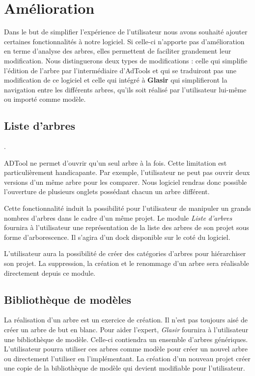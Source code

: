 \section{Amélioration}


	Dans le but de simplifier l'expérience de l'utilisateur nous avons souhaité ajouter certaines fonctionnalités à notre logiciel. Si celle-ci n'apporte pas d'amélioration en terme d'analyse des arbres, elles permettent de faciliter grandement leur modification. Nous distinguerons deux types de modifications : celle qui simplifie l'édition de l'arbre par l’intermédiaire d'AdTools et qui se traduiront pas une modification de ce logiciel et celle qui intégré à \textbf{Glasir} qui simplifieront la navigation entre les différents arbres, qu'ils soit réalisé par l'utilisateur lui-même ou importé comme modèle. 

	\subsection{Liste d'arbres}.

	ADTool ne permet d'ouvrir qu'un seul arbre à la fois. Cette limitation est particulièrement handicapante. Par exemple, l'utilisateur ne peut pas ouvrir deux versions d'un même arbre pour les comparer. Nous logiciel rendras donc possible l'ouverture de plusieurs onglets possédant chacun un arbre différent. 

	Cette fonctionnalité induit la possibilité pour l'utilisateur de manipuler un grands nombres d'arbres dans le cadre d'un même projet. Le module \emph{Liste d'arbres} fournira à l'utilisateur une représentation de la liste des arbres de son projet sous forme d'arborescence. Il s'agira d'un dock disponible sur le coté du logiciel. 

	L'utilisateur aura la possibilité de créer des catégories d'arbres pour hiérarchiser son projet. La suppression, la création et le renommage d'un arbre sera réalisable directement depuis ce module. 

	\subsection{Bibliothèque de modèles}


	La réalisation d'un arbre est un exercice de création. Il n'est pas toujours aisé de créer un arbre de but en blanc. Pour aider l'expert, \emph{Glasir} fournira à l'utilisateur une bibliothèque de modèle. Celle-ci contiendra un ensemble d'arbres génériques. L'utilisateur pourra utiliser ces arbres comme modèle pour créer un nouvel arbre ou directement l'utiliser en l'implémentant. La création d'un nouveau projet créer une copie de la bibliothèque de modèle qui devient modifiable pour l'utilisateur.		

